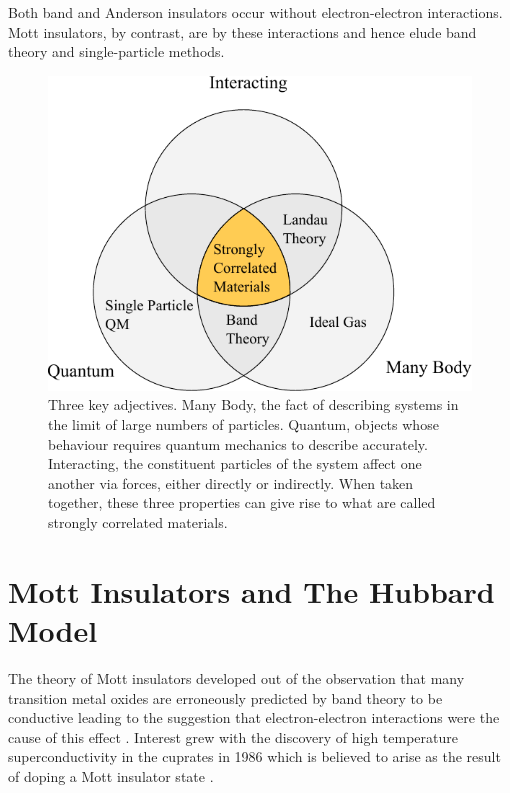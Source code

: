 Both band and Anderson insulators occur without electron-electron interactions. Mott insulators, by contrast, are by these interactions and hence elude band theory and single-particle methods.

\hypertarget{fig:venn_diagram}{%
\begin{figure}
\centering
\includegraphics[width=1\textwidth,height=\textheight]{figure_code/intro_chapter/venn_diagram}
\caption[{Interacting Quantum Many Body Systems Venn Diagram}]{Three key adjectives. Many Body, the fact of describing systems in the limit of large numbers of particles. Quantum, objects whose behaviour requires quantum mechanics to describe accurately. Interacting, the constituent particles of the system affect one another via forces, either directly or indirectly. When taken together, these three properties can give rise to what are called strongly correlated materials.}
\label{fig:venn_diagram}
\end{figure}
}

\hypertarget{mott-insulators-and-the-hubbard-model}{%
\section{Mott Insulators and The Hubbard Model}\label{mott-insulators-and-the-hubbard-model}}

The theory of Mott insulators developed out of the observation that many transition metal oxides are erroneously predicted by band theory to be conductive \autocite{boerSemiconductorsPartiallyCompletely1937} leading to the suggestion that electron-electron interactions were the cause of this effect \autocite{mottDiscussionPaperBoer1937}. Interest grew with the discovery of high temperature superconductivity in the cuprates in 1986 \autocite{bednorzPossibleHighTcSuperconductivity1986} which is believed to arise as the result of doping a Mott insulator state \autocite{leeDopingMottInsulator2006}.

